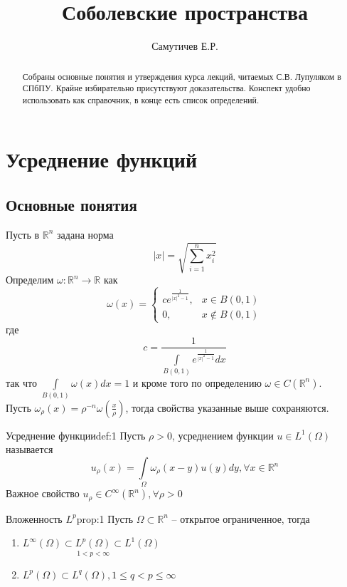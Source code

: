 \documentclass[12pt,a4paper]{article}
\date{}
\title{Соболевские пространства}
\author{Самутичев Е.Р.}
\newcommand{\intset}[1]{\int\limits_{#1}}
\newcommand{\Real}{\mathbb{R}}
\begin{document}
	
\maketitle
\begin{abstract}
	Собраны основные понятия и утверждения курса лекций, читаемых С.В. Лупуляком в СПбПУ. Крайне избирательно присутствуют доказательства. Конспект удобно использовать как справочник, в конце есть список определений. 
\end{abstract}

\section{Усреднение функций}
	
\subsection{Основные понятия}

Пусть в $\Real^n$ задана норма 
$$|x| = \sqrt{\sum_{i=1}^{n}{x_i^2}}$$ 
Определим $\omega: \Real^n \to \Real$ как
\begin{equation*}
	\omega (x) = 
		\begin{cases}
		c e^{\frac{1}{|x|^2 - 1}}, & x \in B(0, 1) \\
		0, & x \notin B(0, 1)
		\end{cases}
\end{equation*}
где 
$$c  = \frac{1}{\intset{B(0,1)}{e^{\frac{1}{|x|^2 - 1}}dx}}$$
так что $\intset{B(0,1)}{\omega(x)dx} = 1$ и кроме того по определению $\omega \in C(\Real^n)$. \\ Пусть $\omega_\rho (x) = \rho^{-n} \omega \left(\frac{x}{\rho}\right)$, тогда свойства указанные выше сохраняются.

\begin{definition}{Усреднение функции}{def:1}
	Пусть $\rho > 0$, усреднением функции $u \in L^{1}(\Omega)$ называется 
	$$u_\rho (x) = \intset{\Omega}{\omega_\rho (x - y) u(y) dy}, \forall x \in \Real^n$$
	Важное свойство $u_\rho \in C^{\infty}(\Real^n), \forall \rho > 0$
\end{definition}

\begin{proposition}{Вложенность $L^p$}{prop:1}
	Пусть $\Omega \subset \Real^n$ -- открытое ограниченное, тогда
	\begin{enumerate}
		\item $L^{\infty}(\Omega) \subset \underset{1 < p < \infty}{L^{p}(\Omega)} \subset L^{1}(\Omega)$
		\item $L^{p}(\Omega) \subset L^{q}(\Omega), 1 \leq q < p \leq \infty$
	\end{enumerate}
\end{proposition}
\end{document}
